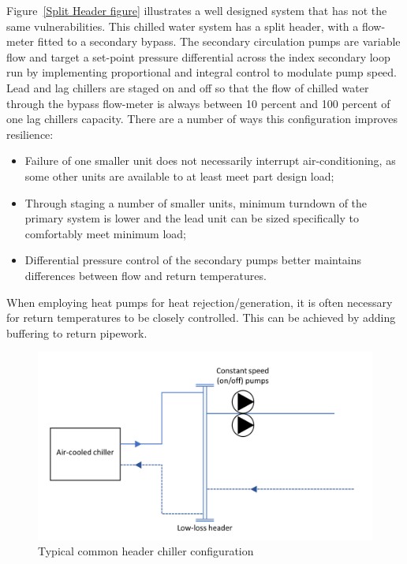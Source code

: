 \documentclass[11pt, oneside]{book}   	%
\begin{document}
Figure~\ref{Split Header figure} illustrates a well designed system that has not the same vulnerabilities.
This chilled water system has a split header, with a flow-meter fitted to a secondary bypass.
The secondary circulation pumps are variable flow and target a set-point pressure differential across the index secondary loop run by implementing proportional and integral control to modulate pump speed.
Lead and lag chillers are staged on and off so that the flow of chilled water through the bypass flow-meter is always between 10 percent and 100 percent of one lag chillers capacity.
There are a number of ways this configuration improves resilience:
\begin{itemize}
	\item Failure of one smaller unit does not necessarily interrupt air-conditioning, as some other units are available to at least meet part design load; 
	\item Through staging a number of smaller units, minimum turndown of the primary system is lower and the lead unit can be sized specifically to comfortably meet minimum load;
	\item Differential pressure control of the secondary pumps better maintains differences between flow and return temperatures.
\end{itemize}
When employing heat pumps for heat rejection/generation, it is often necessary for return temperatures to be closely controlled.
This can be achieved by adding buffering to return pipework.\

\pagebreak

\FloatBarrier
\begin{figure}
\begin{center}
\includegraphics[width=1\textwidth]{commonHeader.PNG}
\caption{Typical common header chiller configuration}
\label{Common Header figure}
\end{center}
\end{figure}
\FloatBarrier
\end{document}

